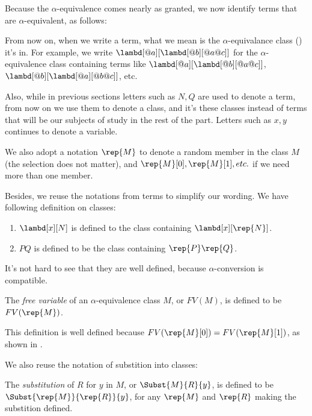 \documentclass[../../../include/open-logic-section]{subfiles}
\begin{document}

Because the $\alpha$-equivalence comes nearly as granted, we now
identify terms that are $\alpha$-equivalent, as follows:

From now on, when we write a term, what we mean is the
$\alpha$-equivalance class () it's in. For
example, we write $\lambd[@a][\lambd[@b][@a @c]]$ for the
$\alpha$-equivalence class containing terms like
$\lambd[@a][\lambd[@b][@a @c]]$, $\lambd[@b][\lambd[@a][@b @c]]$, etc.

Also, while in previous sections letters such as $N, Q$ are used to
denote a term, from now on we use them to denote a class,
and it's these classes instead of terms that
will be our subjects of study in the rest of the part. Letters such as
$x, y$ continues to denote a variable.

We also adopt a notation $\rep{M}$ to denote a random member in the
class $M$ (the selection does not matter), and $\rep{M}[0], \rep{M}[1], etc. $ if we need more than
one member.

Besides, we reuse the notations from terms to simplify our wording. We
have following definition on classes:
\begin{defn}
  \begin{enumerate}
  \item $\lambd[x][N]$ is defined to the class containing
    $\lambd[x][\rep{N}]$.
  \item $PQ$ is defined to be the class containing $\rep{P}\rep{Q}$.
  \end{enumerate}
\end{defn}

It's not hard to see that they are well defined, because
$\alpha$-conversion is compatible.

\begin{defn} 
  The \emph{free variable} of an $\alpha$-equivalence class $M$, or $FV(M)$, is defined to be $FV(\rep{M})$.
\end{defn}

This definition is well defined because $FV(\rep{M}[0]) = FV(\rep{M}[1])$, as shown in .

We also reuse the notation of substition into classes:
\begin{defn} 
  The \emph{substitution} of $R$ for $y$ in $M$, or $\Subst{M}{R}{y}$, is
  defined to be $\Subst{\rep{M}}{\rep{R}}{y}$, for any $\rep{M}$ and
  $\rep{R}$ making the substition defined.
\end{defn}
\end{document}
